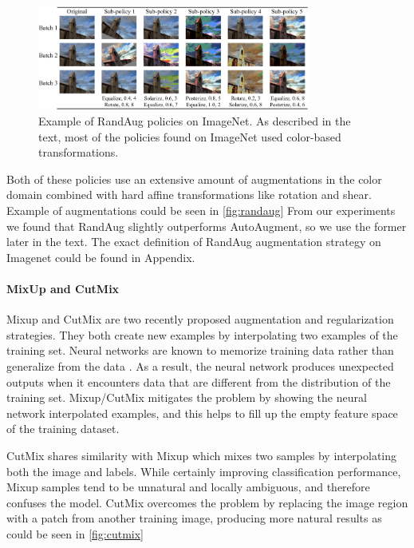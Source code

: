 \begin{figure}[ht!]
    \centering
    \includegraphics[width=0.8\textwidth]{images/randaug_policy.png}
    \caption{Example of RandAug policies on ImageNet. As described in the text, most of the policies found on ImageNet used color-based transformations.}
    \label{fig:randaug}
  \end{figure}

Both of these policies use an extensive amount of augmentations in the color domain combined with hard affine transformations like rotation and shear. Example of augmentations could be seen in \autoref{fig:randaug}
From our experiments we found that RandAug slightly outperforms AutoAugment, so we use the former later in the text. The exact definition of RandAug augmentation strategy on Imagenet could be found in Appendix. 


\paragraph{MixUp and CutMix}


Mixup \cite{zhang2017_mixup} and CutMix \cite{yun2019_cutmix} are two recently proposed augmentation and regularization strategies. They both create new examples by interpolating two examples of the training set. Neural networks are known to memorize training data rather than generalize from the data \cite{zhang2016_understanding_deep}. As a result, the neural network produces unexpected outputs when it encounters data that are different from the distribution of the training set. Mixup/CutMix mitigates the problem by showing the neural network interpolated examples, and this helps to fill up the empty feature space of the training dataset.



CutMix shares similarity with Mixup which mixes two samples by interpolating both the image and labels. While certainly improving classification performance, Mixup samples tend to be unnatural and locally ambiguous, and therefore confuses the model. CutMix overcomes the problem by replacing the image region with a patch from another training image, producing more natural results as could be seen in \autoref{fig:cutmix}

